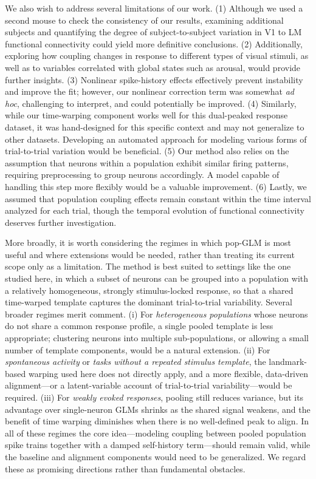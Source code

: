 \documentclass[12pt]{article}
\begin{document}
We also wish to address several limitations of our work. (1) Although we used a second mouse to check the consistency of our results, examining additional subjects and quantifying the degree of subject-to-subject variation in V1 to LM functional connectivity could yield more definitive conclusions. (2) Additionally, exploring how coupling changes in response to different types of visual stimuli, as well as to variables correlated with global states such as arousal, would provide further insights. (3) Nonlinear spike-history effects effectively prevent instability and improve the fit; however, our nonlinear correction term was somewhat {\em ad hoc}, challenging to interpret, and could potentially be improved. (4) Similarly, while our time-warping component works well for this dual-peaked response dataset, it was hand-designed for this specific context and may not generalize to other datasets. Developing an automated approach for modeling various forms of trial-to-trial variation would be beneficial. (5) Our method also relies on the assumption that neurons within a population exhibit similar firing patterns, requiring preprocessing to group neurons accordingly. A model capable of handling this step more flexibly would be a valuable improvement. (6) Lastly, we assumed that population coupling effects remain constant within the time interval analyzed for each trial, though the temporal evolution of functional connectivity deserves further investigation.

More broadly, it is worth considering the regimes in which pop-GLM is most useful and where extensions would be needed, rather than treating its current scope only as a limitation. The method is best suited to settings like the one studied here, in which a subset of neurons can be grouped into a population with a relatively homogeneous, strongly stimulus-locked response, so that a shared time-warped template captures the dominant trial-to-trial variability. Several broader regimes merit comment. (i) For \emph{heterogeneous populations} whose neurons do not share a common response profile, a single pooled template is less appropriate; clustering neurons into multiple sub-populations, or allowing a small number of template components, would be a natural extension. (ii) For \emph{spontaneous activity} or \emph{tasks without a repeated stimulus template}, the landmark-based warping used here does not directly apply, and a more flexible, data-driven alignment---or a latent-variable account of trial-to-trial variability---would be required. (iii) For \emph{weakly evoked responses}, pooling still reduces variance, but its advantage over single-neuron GLMs shrinks as the shared signal weakens, and the benefit of time warping diminishes when there is no well-defined peak to align. In all of these regimes the core idea---modeling coupling between pooled population spike trains together with a damped self-history term---should remain valid, while the baseline and alignment components would need to be generalized. We regard these as promising directions rather than fundamental obstacles.
\end{document}
